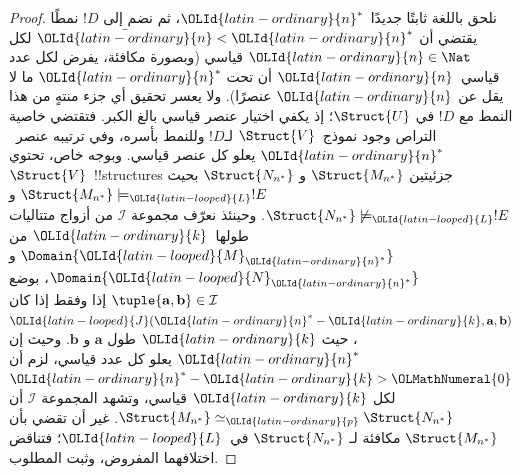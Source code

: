 \documentclass[../../../include/open-logic-section]{subfiles}
\begin{document}
\begin{proof}
نلحق باللغة ثابتًا جديدًا~$\OLId{latin-ordinary}{n}^*$، ثم نضم إلى $!D$ نمطًا يقتضي أن
$\bar \OLId{latin-ordinary}{n} < \OLId{latin-ordinary}{n}^*$ لكل $\OLId{latin-ordinary}{n} \in \Nat$ قياسي (وبصورة مكافئة، يفرض لكل عدد
قياسي~$\OLId{latin-ordinary}{n}$ أن تحت $\OLId{latin-ordinary}{n}^*$ ما لا يقل عن $\OLId{latin-ordinary}{n}$ عنصرًا). ولا يعسر تحقيق أي جزء منتهٍ من هذا
النمط مع $!D$ في $\Struct{U}$؛ إذ يكفي اختيار عنصر قياسي بالغ الكبر.
فتقتضي خاصية التراص وجود نموذج~$\Struct{V}$ لـ$!D$ وللنمط بأسره، وفي
ترتيبه عنصر~$\OLId{latin-ordinary}{n}^*$ يعلو كل عنصر قياسي. وبوجه خاص، تحتوي
$\Struct{V}$~!!{structure}s جزئيتين $\Struct{M_{n^*}}$ و
$\Struct{N_{n^*}}$ بحيث $\Struct{M_{n^*}} \models_\OLId{latin-looped}{L} !E$ و
$\Struct{N_{n^*}} \not\models_\OLId{latin-looped}{L} !E$. وحينئذ نعرّف مجموعة
$\mathcal{I}$ من أزواج متتاليات طولها~$\OLId{latin-ordinary}{k}$ من $\Domain{\OLId{latin-looped}{M}_{\OLId{latin-ordinary}{n}^*}}$ و
$\Domain{\OLId{latin-looped}{N}_{\OLId{latin-ordinary}{n}^*}}$، بوضع
$\tuple{\mathbf{a},\mathbf{b}} \in \mathcal{I}$ إذا وفقط إذا كان
$\OLId{latin-looped}{J}(\OLId{latin-ordinary}{n}^*-\OLId{latin-ordinary}{k},\mathbf{a},\mathbf{b})$، حيث $\OLId{latin-ordinary}{k}$ طول $\mathbf{a}$ و
$\mathbf{b}$. وحيث إن $\OLId{latin-ordinary}{n}^*$ يعلو كل عدد قياسي، لزم أن
$\OLId{latin-ordinary}{n}^*-\OLId{latin-ordinary}{k}>\OLMathNumeral{0}$ لكل $\OLId{latin-ordinary}{k}$ قياسي، وتشهد المجموعة $\mathcal{I}$ أن
$\Struct{M_{n^*}} \simeq_\OLId{latin-ordinary}{p} \Struct{N_{n^*}}$. غير أن
 تقضي بأن $\Struct{M_{n^*}}$ مكافئة لـ
$\Struct{N_{n^*}}$ في~$\OLId{latin-looped}{L}$؛ فتناقض اختلافهما المفروض، وثبت المطلوب.
\end{proof}
\end{document}
